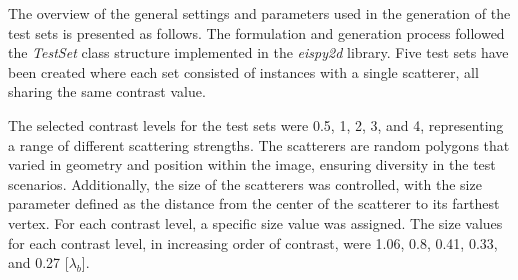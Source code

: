 			
			The overview of the general settings and parameters used in the generation of the test sets is presented as follows. The formulation and generation process followed the \textit{TestSet} class structure implemented in the \textit{eispy2d} library. Five test sets have been created where each set consisted of instances with a single scatterer, all sharing the same contrast value.
			
			The selected contrast levels for the test sets were 0.5, 1, 2, 3, and 4, representing a range of different scattering strengths. The scatterers are random polygons that varied in geometry and position within the image, ensuring diversity in the test scenarios. Additionally, the size of the scatterers was controlled, with the size parameter defined as the distance from the center of the scatterer to its farthest vertex. For each contrast level, a specific size value was assigned. The size values for each contrast level, in increasing order of contrast, were 1.06, 0.8, 0.41, 0.33, and 0.27 [$\lambda_b$].
			
